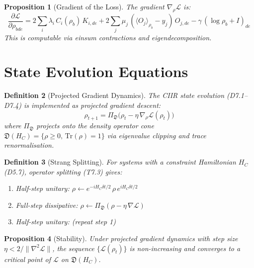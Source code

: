 \documentclass[11pt,a4paper]{article}
\newtheorem{definition}{Definition}[section]
\newtheorem{proposition}[definition]{Proposition}
\newcommand{\HC}{H_C}
\newcommand{\CL}{\mathcal{L}}
\newcommand{\Tr}{\mathrm{Tr}}
\begin{document}
\begin{proposition}[Gradient of the Loss]
\label{prop:gradient}
The gradient $\nabla_\rho \CL$ is:
\[
  \frac{\partial \CL}{\partial \rho_{bde}} =
    2 \sum_i \lambda_i\, C_i(\rho_b)\, K_{i,de}
    + 2 \sum_j \mu_j\, (\langle O_j \rangle_{\rho_b} - y_j)\, O_{j,de}
    - \gamma\, (\log \rho_b + I)_{de}
\]
This is computable via einsum contractions and eigendecomposition.
\end{proposition}

\section{State Evolution Equations}
\label{sec:evolution}

\begin{definition}[Projected Gradient Dynamics]
\label{def:proj-grad}
The CIIR state evolution (D7.1--D7.4) is implemented as projected
gradient descent:
\[
  \rho_{t+1} = \Pi_{\mathfrak{D}}
    \bigl(\rho_t - \eta\, \nabla_\rho \CL(\rho_t)\bigr)
\]
where $\Pi_{\mathfrak{D}}$ projects onto the density operator cone
$\mathfrak{D}(\HC) = \{\rho \geq 0,\, \Tr(\rho) = 1\}$ via eigenvalue
clipping and trace renormalisation.
\end{definition}

\begin{definition}[Strang Splitting]
\label{def:strang}
For systems with a constraint Hamiltonian $H_C$ (D5.7), operator
splitting (T7.3) gives:
\begin{enumerate}
  \item Half-step unitary:
    $\rho \leftarrow e^{-iH_C \delta t/2}\, \rho\, e^{iH_C \delta t/2}$
  \item Full-step dissipative:
    $\rho \leftarrow \Pi_{\mathfrak{D}}(\rho - \eta\, \nabla \CL)$
  \item Half-step unitary: (repeat step 1)
\end{enumerate}
\end{definition}

\begin{proposition}[Stability]
\label{prop:stability}
Under projected gradient dynamics with step size
$\eta < 2/\|\nabla^2 \CL\|$, the sequence $\{\CL(\rho_t)\}$ is
non-increasing and converges to a critical point of $\CL$ on
$\mathfrak{D}(\HC)$.
\end{proposition}
\end{document}
